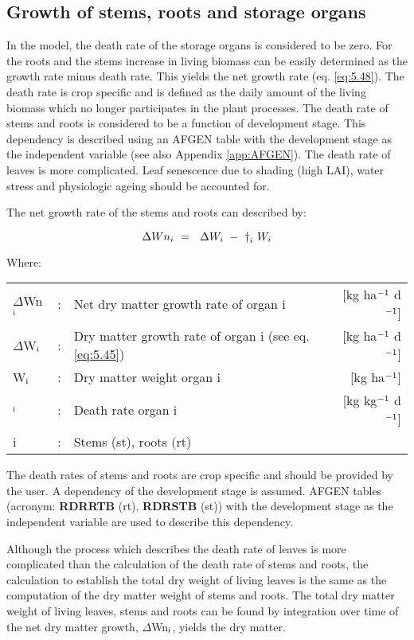 \subsection{Growth of stems, roots and storage organs}

In the model, the death rate of the storage organs is considered to be zero. For the roots
and the stems increase in living biomass can be easily determined as the growth rate
minus death rate. This yields the net growth rate (eq. \ref{eq:5.48}). The death rate is crop
specific and is defined as the daily amount of the living biomass which no longer
participates in the plant processes. The death rate of stems and roots is considered to be a
function of development stage. This dependency is described using an
AFGEN table with the development stage as the independent variable (see also Appendix
\ref{app:AFGEN}). The death rate of leaves is more complicated. Leaf senescence due to shading (high
LAI), water stress and physiologic ageing should be accounted for.

The net growth rate of the stems and roots can described by:

\begin{equation}
\label{eq:5.48}
\Delta Wn _{i~} =~\,\,\Delta W _{i~} -~ {\rm \dag } _{i} \,\, W _{i} 
\end{equation}

Where:\\[5pt]
\begin{tabularx}{\textwidth}{llXr}
	$\Delta$Wn$_{{\rm i}}$ &:& Net dry matter growth rate of organ i   &
	[kg ha$^{{\rm -1}}$ d$^{{\rm -1}}$]\\
	$\Delta$W$_{{\rm i}}$ &:& Dry matter growth rate of organ i (see eq. \ref{eq:5.45})   &
	[kg ha$^{{\rm -1}}$ d$^{{\rm -1}}$]\\
	W$_{{\rm i}}$ &:& Dry matter weight organ i  &
	[kg ha$^{{\rm -1}}$]\\
	\dag $_{{\rm i}}$ &:& Death rate organ i   &
	[kg kg$^{{\rm -1}}$ d$^{{\rm -1}}$]\\
	i &:& Stems (st), roots (rt)\\
\end{tabularx}

The death rates of stems and roots are crop specific and should be provided by the user.
A dependency of the development stage is assumed. AFGEN tables (acronym: {\bf RDRRTB}
(rt), {\bf RDRSTB} (st)) with the development stage as the independent variable are used to
describe this dependency.

Although the process which describes the death rate of leaves is more complicated than
the calculation of the death rate of stems and roots, the calculation to establish the total
dry weight of living leaves is the same as the computation of the dry matter weight of
stems and roots. The total dry matter weight of living leaves, stems and roots can be
found by integration over time of the net dry matter growth, $\Delta$Wn$_{{\rm i}}$, yields 
the dry matter.

